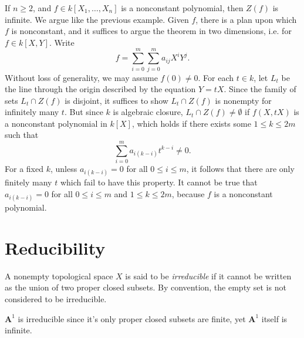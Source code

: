 \begin{example}
    If $n \geq 2$, and $f \in k[X_1,\dots,X_n]$ is a nonconstant polynomial, then $Z(f)$ is infinite. We argue like the previous example. Given $f$, there is a plan upon which $f$ is nonconstant, and it suffices to argue the theorem in two dimensions, i.e. for $f \in k[X,Y]$. Write
    \[ f = \sum_{i = 0}^m \sum_{j = 0}^m a_{ij} X^i Y^j. \]
    Without loss of generality, we may assume $f(0) \neq 0$. For each $t \in k$, let $L_t$ be the line through the origin described by the equation $Y = tX$. Since the family of sets $L_t \cap Z(f)$ is disjoint, it suffices to show $L_t \cap Z(f)$ is nonempty for infinitely many $t$. But since $k$ is algebraic closure, $L_t \cap Z(f) \neq \emptyset$ if $f(X,tX)$ is a nonconstant polynomial in $k[X]$, which holds if there exists some $1 \leq k \leq 2m$ such that
    \[ \sum_{i = 0}^m a_{i(k-i)} t^{k-i} \neq 0. \]
    For a fixed $k$, unless $a_{i(k-i)} = 0$ for all $0 \leq i \leq m$, it follows that there are only finitely many $t$ which fail to have this property. It cannot be true that $a_{i(k-i)} = 0$ for all $0 \leq i \leq m$ and $1 \leq k \leq 2m$, because $f$ is a nonconstant polynomial.
\end{example}


\section{Reducibility}

A nonempty topological space $X$ is said to be \emph{irreducible} if it cannot be written as the union of two proper closed subsets. By convention, the empty set is not considered to be irreducible.

\begin{example}
    $\mathbf{A}^1$ is irreducible since it's only proper closed subsets are finite, yet $\mathbf{A}^1$ itself is infinite.
\end{example}

